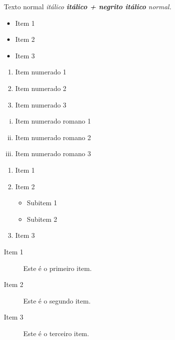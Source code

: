 \documentclass[]{article}
\author{Lucas Arantes Berg}
\begin{document}
	
	Texto normal \itshape{itálico \bfseries{itálico + negrito} itálico} normal.
	
	\begin{itemize}
		\item Item 1
		\item Item 2
		\item Item 3
	\end{itemize}
	
	\begin{enumerate}
		\item Item numerado 1
		\item Item numerado 2
		\item Item numerado 3
	\end{enumerate}
	
	\begin{enumerate}[(i)]
		\item Item numerado romano 1
		\item Item numerado romano 2
		\item Item numerado romano 3
	\end{enumerate}
	
	\begin{enumerate}
		\item Item 1
		\item Item 2
		\begin{itemize}
			\item Subitem 1
			\item Subitem 2 
		\end{itemize}
		\item Item 3  
	\end{enumerate}
	
	\begin{description}
		\item[Item 1] Este é o primeiro item.
		\item[Item 2] Este é o segundo item.
		\item[Item 3] Este é o terceiro item.
	\end{description}
	
		
\end{document}
